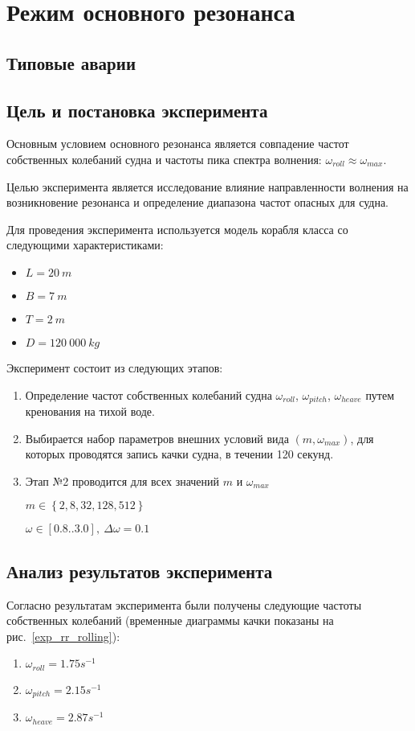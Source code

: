 \section{Режим основного резонанса}

\subsection{Типовые аварии}


\subsection{Цель и постановка эксперимента}

Основным условием основного резонанса является совпадение частот собственных колебаний судна и частоты пика спектра волнения: $\omega_{roll} \approx \omega_{max}$.

Целью эксперимента является исследование влияние направленности волнения на возникновение резонанса и определение диапазона частот опасных для судна.

Для проведения эксперимента используется модель корабля класса  со следующими характеристиками:
\begin{itemize}
	\item	$L = 20\ m$
	\item	$B = 7\ m$
	\item	$T = 2\ m$
	\item	$D = 120\ 000\ kg$
\end{itemize}

Эксперимент состоит из следующих этапов:
\begin{enumerate}
	\item	Определение частот собственных колебаний судна 
			$\omega_{roll}$, $\omega_{pitch}$, $\omega_{heave}$ путем кренования на тихой воде.
	\item	Выбирается набор параметров внешних условий вида $(m, \omega_{max})$, для которых
			проводятся запись качки судна, в течении 120 секунд.
	\item	Этап №2	проводится для всех значений $m$ и $\omega_{max}$
	
			$m \in \left\lbrace 2,8,32,128,512 \right\rbrace$
			
			$\omega \in [0.8..3.0],\ \Delta\omega=0.1$ 

\end{enumerate}

\subsection{Анализ результатов эксперимента}
Согласно результатам эксперимента были получены следующие частоты собственных колебаний (временные диаграммы качки показаны на рис.~\ref{exp_rr_rolling}):
\begin{enumerate}
	\item	$ \omega_{roll} = 1.75 s^{-1}$
	\item	$ \omega_{pitch} = 2.15 s^{-1}$
	\item	$ \omega_{heave} = 2.87 s^{-1}$
\end{enumerate}

